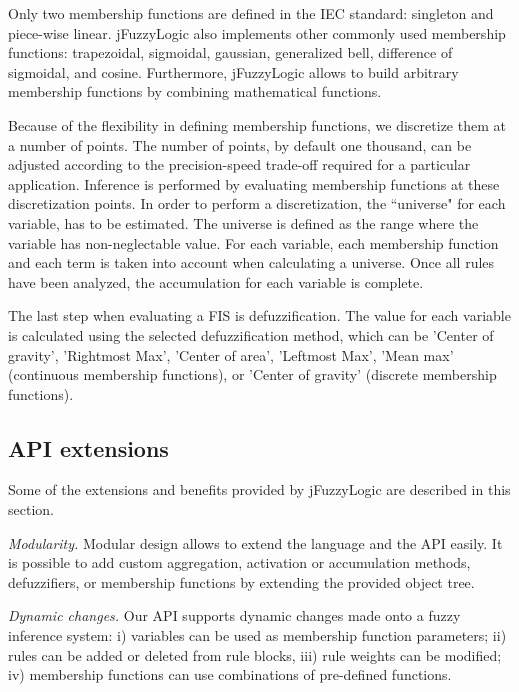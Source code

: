\documentclass[conference]{IEEEtran}
\begin{document}
Only two membership functions are defined in the IEC standard: singleton and piece-wise linear.
jFuzzyLogic also implements other commonly used membership functions: trapezoidal, sigmoidal, gaussian, generalized bell, difference of sigmoidal, and cosine.
Furthermore, jFuzzyLogic allows to build arbitrary membership functions by combining mathematical functions.

Because of the flexibility in defining membership functions, we discretize them at a number of points.
The number of points, by default one thousand, can be adjusted according to the precision-speed trade-off required for a particular application.
Inference is performed by evaluating membership functions at these discretization points.
In order to perform a discretization, the ``universe" for each variable, has to be estimated. 
The universe is defined as the range where the variable has non-neglectable value. 
For each variable, each membership function and each term is taken into account when calculating a universe.
Once all rules have been analyzed, the accumulation for each variable is complete. 

The last step when evaluating a FIS is defuzzification.
The value for each variable is calculated using the selected defuzzification method, which can be 'Center of gravity', 'Rightmost Max', 'Center of area', 'Leftmost Max', 'Mean max' (continuous membership functions), or 'Center of gravity' (discrete membership functions). 

\subsection{API extensions \label{sec:ext}}

Some of the extensions and benefits provided by jFuzzyLogic are described in this section.

\textit{Modularity.} Modular design allows to extend the language and the API easily. It is possible to add custom aggregation, activation or accumulation methods, defuzzifiers, or membership functions by extending the provided object tree. 


\textit{Dynamic changes.} Our API supports dynamic changes made onto a fuzzy inference system: i) variables can be used as membership function parameters; ii) rules can be added or deleted from rule blocks, iii) rule weights can be modified; iv) membership functions can use combinations of pre-defined functions. 
\end{document}
